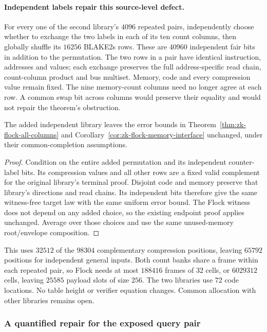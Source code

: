 \paragraph{Independent labels repair this source-level defect.} For every one of the second library's $4096$ repeated pairs, independently choose whether to exchange the two labels in each of its ten count columns, then globally shuffle its $16256$ BLAKE2s rows. These are $40960$ independent fair bits in addition to the permutation. The two rows in a pair have identical instruction, addresses and values; each exchange preserves the full address-specific read chain, count-column product and bus multiset. Memory, code and every compression value remain fixed. The nine memory-count columns need no longer agree at each row. A common swap bit across columns would preserve their equality and would not repair the theorem's obstruction.

\begin{proposition}\label{prop:zk-flock-global-extension}
The added independent library leaves the error bounds in Theorem~\ref{thm:zk-flock-all-columns} and Corollary~\ref{cor:zk-flock-memory-interface} unchanged, under their common-completion assumptions.
\end{proposition}
\begin{proof}
Condition on the entire added permutation and its independent counter-label bits. Its compression values and all other rows are a fixed valid complement for the original library's terminal proof. Disjoint code and memory preserve that library's directions and read chains. Its independent bits therefore give the same witness-free target law with the same uniform error bound. The Flock witness does not depend on any added choice, so the existing endpoint proof applies unchanged. Average over those choices and use the same unused-memory root/envelope composition.
\end{proof}

This uses $32512$ of the $98304$ complementary compression positions, leaving $65792$ positions for independent general inputs. Both count banks share a frame within each repeated pair, so Flock needs at most $188416$ frames of $32$ cells, or $6029312$ cells, leaving $25585$ payload slots of size $256$. The two libraries use $72$ code locations. No table height or verifier equation changes. Common allocation with other libraries remains open.

\subsubsection{A quantified repair for the exposed query pair}

